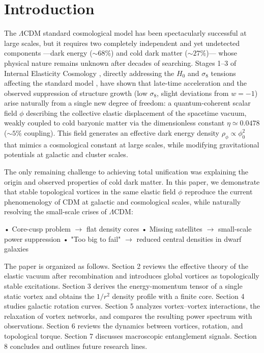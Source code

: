 \documentclass[11pt,a4paper]{article}
\begin{document}
	\section{Introduction}
	The $\Lambda$CDM standard cosmological model has been spectacularly successful at large scales, but it requires two completely independent and yet undetected components —dark energy ($\sim 68\%$) and cold dark matter ($\sim 27\%$)— whose physical nature remains unknown after decades of searching. Stages 1--3 of Internal Elasticity Cosmology \cite{alanis2025stage1,alanis2025stage2,alanis2025stage3}, directly addressing the $H_0$ and $\sigma_8$ tensions affecting the standard model \cite{Planck2018, alanis2025stage3}, have shown that late-time acceleration and the observed suppression of structure growth (low $\sigma_8$, slight deviations from $w=-1$) arise naturally from a single new degree of freedom: a quantum-coherent scalar field $\phi$ describing the collective elastic displacement of the spacetime vacuum, weakly coupled to cold baryonic matter via the dimensionless constant $\eta \simeq 0.0478$ ($\sim 5\%$ coupling). This field generates an effective dark energy density $\rho_\phi \propto \phi_0^2$ that mimics a cosmological constant at large scales, while modifying gravitational potentials at galactic and cluster scales.
	
	The only remaining challenge to achieving total unification was explaining the origin and observed properties of cold dark matter. In this paper, we demonstrate that stable topological vortices in the same elastic field $\phi$ reproduce the current phenomenology of CDM at galactic and cosmological scales, while naturally resolving the small-scale crises of $\Lambda$CDM:
	
	• Core-cusp problem $\rightarrow$ flat density cores  
	• Missing satellites $\rightarrow$ small-scale power suppression  
	• "Too big to fail" $\rightarrow$ reduced central densities in dwarf galaxies  
	
	The paper is organized as follows. Section 2 reviews the effective theory of the elastic vacuum after recombination and introduces global vortices as topologically stable excitations. Section 3 derives the energy-momentum tensor of a single static vortex and obtains the $1/r^2$ density profile with a finite core. Section 4 studies galactic rotation curves. Section 5 analyzes vortex–vortex interactions, the relaxation of vortex networks, and compares the resulting power spectrum with observations. Section 6 reviews the dynamics between vortices, rotation, and topological torque. Section 7 discusses macroscopic entanglement signals. Section 8 concludes and outlines future research lines.
	
\end{document}
